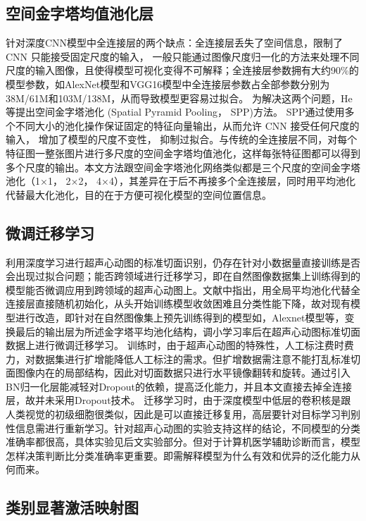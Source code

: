 \subsection{空间金字塔均值池化层}

针对深度CNN模型中全连接层的两个缺点：全连接层丢失了空间信息，限制了 CNN 只能接受固定尺度的输入， 一般只能通过图像尺度归一化的方法来处理不同尺度的输入图像，且使得模型可视化变得不可解释；全连接层参数拥有大约90\%的模型参数，如AlexNet模型\citep{Krizhevsky2012}和VGG16模型\citep{Chatfield2014}中全连接层参数占全部参数分别为38M/61M和103M/138M，从而导致模型更容易过拟合\citep{Szegedy2015}。
为解决这两个问题，He等提出空间金字塔池化 (Spatial Pyramid Pooling， SPP)方法\citep{He2015spp}。 SPP通过使用多个不同大小的池化操作保证固定的特征向量输出，从而允许 CNN 接受任何尺度的输入， 增加了模型的尺度不变性， 抑制过拟合。与传统的全连接层不同，对每个特征图一整张图片进行多尺度的空间金字塔均值池化，这样每张特征图都可以得到多个尺度的输出。本文方法跟空间金字塔池化网络类似都是三个尺度的空间金字塔池化（1×1， 2×2， 4×4），其差异在于后不再接多个全连接层，同时用平均池化代替最大化池化，目的在于方便可视化模型的空间位置信息。
\subsection{微调迁移学习}

   利用深度学习进行超声心动图的标准切面识别，仍存在针对小数据量直接训练是否会出现过拟合问题；能否跨领域进行迁移学习，即在自然图像数据集上训练得到的模型能否微调应用到跨领域的超声心动图上。文献中指出，用全局平均池化代替全连接层直接随机初始化，从头开始训练模型收敛困难且分类性能下降，故对现有模型进行改造，即针对在自然图像集上预先训练得到的模型如，Alexnet模型等，变换最后的输出层为所述金字塔平均池化结构，调小学习率后在超声心动图标准切面数据上进行微调迁移学习。
训练时，由于超声心动图的特殊性，人工标注费时费力，对数据集进行扩增能降低人工标注的需求。但扩增数据需注意不能打乱标准切面图像内在的局部结构，因此对切面数据只进行水平镜像翻转和旋转。通过引入BN归一化层能减轻对Dropout的依赖，提高泛化能力，并且本文直接去掉全连接层，故并未采用Dropout技术。
迁移学习时，由于深度模型中低层的卷积核是跟人类视觉的初级细胞很类似，因此是可以直接迁移复用，高层要针对目标学习判别性信息需进行重新学习\citep{Zhou2015}。针对超声心动图的实验支持这样的结论，不同模型的分类准确率都很高，具体实验见后文实验部分。但对于计算机医学辅助诊断而言，模型怎样决策判断比分类准确率更重要。即需解释模型为什么有效和优异的泛化能力从何而来。
\subsection{类别显著激活映射图}

